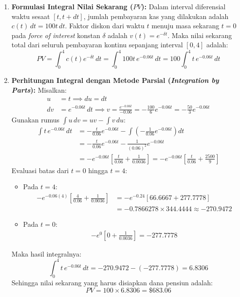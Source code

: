 \documentclass[11pt,a4paper]{article}
\begin{document}
\begin{solutionbox}[Soal 9]
\begin{enumerate}[label=(\alph*)]
    \item \textbf{Formulasi Integral Nilai Sekarang ($PV$):}
    Dalam interval diferensial waktu sesaat $[t, t+dt]$, jumlah pembayaran kas yang dilakukan adalah $c(t) \, dt = 100t \, dt$.
    Faktor diskon dari waktu $t$ menuju masa sekarang $t=0$ pada \textit{force of interest} konstan $\delta$ adalah $v(t) = e^{-\delta t}$.
    Maka nilai sekarang total dari seluruh pembayaran kontinu sepanjang interval $[0, 4]$ adalah:
    \begin{equation*}
        PV = \int_0^4 c(t) e^{-\delta t} \, dt = \int_0^4 100t \, e^{-0.06t} \, dt = 100 \int_0^4 t \, e^{-0.06t} \, dt
    \end{equation*}

    \item \textbf{Perhitungan Integral dengan Metode Parsial (\textit{Integration by Parts}):}
    Misalkan:
    \begin{align*}
        u &= t \implies du = dt \\
        dv &= e^{-0.06t} \, dt \implies v = \frac{e^{-0.06t}}{-0.06} = -\frac{100}{6} e^{-0.06t} = -\frac{50}{3} e^{-0.06t}
    \end{align*}
    Gunakan rumus $\int u \, dv = uv - \int v \, du$:
    \begin{align*}
        \int t \, e^{-0.06t} \, dt &= -\frac{t}{0.06} e^{-0.06t} - \int \left( -\frac{1}{0.06} e^{-0.06t} \right) dt \\
        &= -\frac{t}{0.06} e^{-0.06t} - \frac{1}{(0.06)^2} e^{-0.06t} \\
        &= -e^{-0.06t} \left[ \frac{t}{0.06} + \frac{1}{0.0036} \right] = -e^{-0.06t} \left[ \frac{t}{0.06} + \frac{2500}{9} \right]
    \end{align*}
    Evaluasi batas dari $t = 0$ hingga $t = 4$:
    \begin{itemize}
        \item Pada $t = 4$:
        \begin{align*}
            -e^{-0.06(4)} \left[ \frac{4}{0.06} + \frac{1}{0.0036} \right] &= -e^{-0.24} \left[ 66.6667 + 277.7778 \right] \\
            &= -0.7866278 \times 344.4444 \approx -270.9472
        \end{align*}
        \item Pada $t = 0$:
        \begin{align*}
            -e^{0} \left[ 0 + \frac{1}{0.0036} \right] = -277.7778
        \end{align*}
    \end{itemize}
    Maka hasil integralnya:
    \begin{equation*}
        \int_0^4 t \, e^{-0.06t} \, dt = -270.9472 - (-277.7778) = 6.8306
    \end{equation*}
    Sehingga nilai sekarang yang harus disiapkan dana pensiun adalah:
    \begin{equation*}
        PV = 100 \times 6.8306 = \mathbf{\$683.06}
    \end{equation*}
\end{enumerate}
\end{solutionbox}
\end{document}
